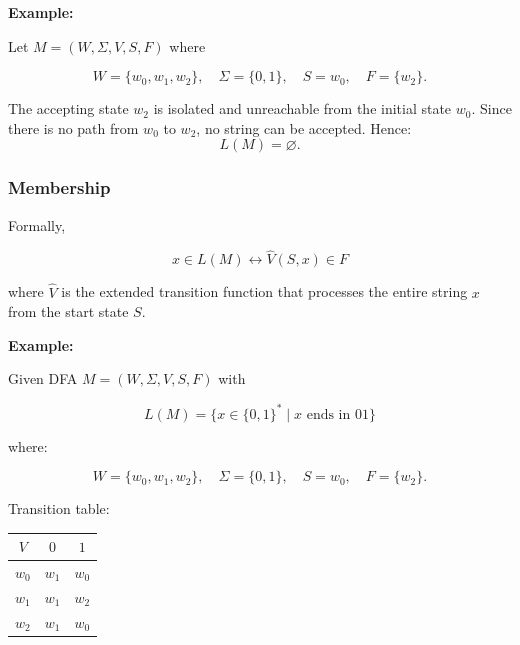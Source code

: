 \documentclass[12pt,a4paper,openany]{article}
\begin{document}
\textbf{Example:}

Let $M = (W,\Sigma,V,S,F)$ where

\[
W = \{w_0,w_1,w_2\},\quad
\Sigma = \{0,1\},\quad
S = w_0,\quad
F = \{w_2\}.
\]

\begin{center}
\end{center}

The accepting state $w_2$ is isolated and unreachable from the initial state $w_0$. Since there is no path from $w_0$ to $w_2$, no string can be accepted. Hence:
\[
L(M) = \varnothing.
\]

\subsubsection{Membership}

Formally, 

\[x \in L(M) \leftrightarrow \hat{V}(S, x) \in F\]

where $\hat{V}$ is the extended transition function that processes the entire string $x$ from the start state $S$.

\textbf{Example:} 
    
Given DFA $M = (W, \Sigma, V, S, F)$ with

\[
L(M) = \{x \in \{0,1\}^* \mid x \text{ ends in } 01\}
\]

where:

\[
W = \{w_0, w_1, w_2\},\quad
\Sigma = \{0,1\},\quad
S = w_0,\quad
F = \{w_2\}.
\]

Transition table:

\begin{center}
\begin{tabular}{c|cc}
$V$ & $0$ & $1$ \\
\hline
$w_0$ & $w_1$ & $w_0$ \\
$w_1$ & $w_1$ & $w_2$ \\
$w_2$ & $w_1$ & $w_0$ \\
\end{tabular}
\end{center}
\end{document}
